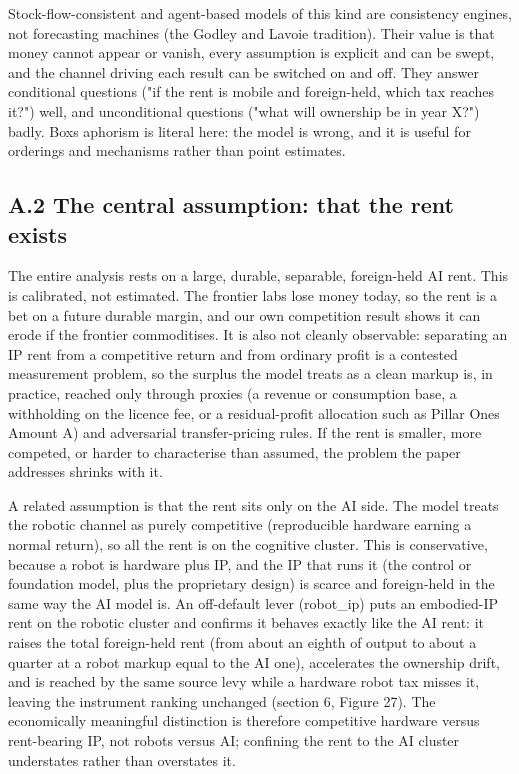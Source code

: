 \documentclass[11pt]{article}
\begin{document}
Stock-flow-consistent and agent-based models of this kind are
consistency engines, not forecasting machines (the Godley and Lavoie
tradition). Their value is that money cannot appear or vanish, every
assumption is explicit and can be swept, and the channel driving each
result can be switched on and off. They answer conditional questions
("if the rent is mobile and foreign-held, which tax reaches it?") well,
and unconditional questions ("what will ownership be in year X?") badly.
Box\textquotesingle s aphorism is literal here: the model is wrong, and
it is useful for orderings and mechanisms rather than point estimates.

\hypertarget{a.2-the-central-assumption-that-the-rent-exists}{%
\subsection{A.2 The central assumption: that the rent
exists}\label{a.2-the-central-assumption-that-the-rent-exists}}

The entire analysis rests on a large, durable, separable, foreign-held
AI rent. This is calibrated, not estimated. The frontier labs lose money
today, so the rent is a bet on a future durable margin, and our own
competition result shows it can erode if the frontier commoditises. It
is also not cleanly observable: separating an IP rent from a competitive
return and from ordinary profit is a contested measurement problem, so
the surplus the model treats as a clean markup is, in practice, reached
only through proxies (a revenue or consumption base, a withholding on
the licence fee, or a residual-profit allocation such as Pillar
One\textquotesingle s Amount A) and adversarial transfer-pricing rules.
If the rent is smaller, more competed, or harder to characterise than
assumed, the problem the paper addresses shrinks with it.

A related assumption is that the rent sits only on the AI side. The
model treats the robotic channel as purely competitive (reproducible
hardware earning a normal return), so all the rent is on the cognitive
cluster. This is conservative, because a robot is hardware plus IP, and
the IP that runs it (the control or foundation model, plus the
proprietary design) is scarce and foreign-held in the same way the AI
model is. An off-default lever (robot\_ip) puts an embodied-IP rent on
the robotic cluster and confirms it behaves exactly like the AI rent: it
raises the total foreign-held rent (from about an eighth of output to
about a quarter at a robot markup equal to the AI one), accelerates the
ownership drift, and is reached by the same source levy while a hardware
robot tax misses it, leaving the instrument ranking unchanged (section
6, Figure 27). The economically meaningful distinction is therefore
competitive hardware versus rent-bearing IP, not robots versus AI;
confining the rent to the AI cluster understates rather than overstates
it.
\end{document}
